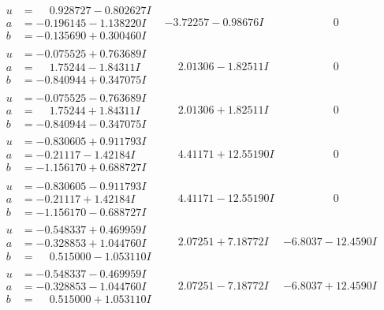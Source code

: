 \documentclass[1p]{elsarticle_modified}
\theoremstyle{definition}
\begin{document}
$$\begin{array}{c|c|c}
\begin{aligned}
u &= \phantom{-}0.928727 - 0.802627 I \\
a &= -0.196145 - 1.138220 I \\
b &= -0.135690 + 0.300460 I\end{aligned}
 & -3.72257 - 0.98676 I & \phantom{-0.000000 } 0 \\ \hline\begin{aligned}
u &= -0.075525 + 0.763689 I \\
a &= \phantom{-}1.75244 - 1.84311 I \\
b &= -0.840944 + 0.347075 I\end{aligned}
 & \phantom{-}2.01306 - 1.82511 I & \phantom{-0.000000 } 0 \\ \hline\begin{aligned}
u &= -0.075525 - 0.763689 I \\
a &= \phantom{-}1.75244 + 1.84311 I \\
b &= -0.840944 - 0.347075 I\end{aligned}
 & \phantom{-}2.01306 + 1.82511 I & \phantom{-0.000000 } 0 \\ \hline\begin{aligned}
u &= -0.830605 + 0.911793 I \\
a &= -0.21117 - 1.42184 I \\
b &= -1.156170 + 0.688727 I\end{aligned}
 & \phantom{-}4.41171 + 12.55190 I & \phantom{-0.000000 } 0 \\ \hline\begin{aligned}
u &= -0.830605 - 0.911793 I \\
a &= -0.21117 + 1.42184 I \\
b &= -1.156170 - 0.688727 I\end{aligned}
 & \phantom{-}4.41171 - 12.55190 I & \phantom{-0.000000 } 0 \\ \hline\begin{aligned}
u &= -0.548337 + 0.469959 I \\
a &= -0.328853 + 1.044760 I \\
b &= \phantom{-}0.515000 - 1.053110 I\end{aligned}
 & \phantom{-}2.07251 + 7.18772 I & -6.8037 - 12.4590 I \\ \hline\begin{aligned}
u &= -0.548337 - 0.469959 I \\
a &= -0.328853 - 1.044760 I \\
b &= \phantom{-}0.515000 + 1.053110 I\end{aligned}
 & \phantom{-}2.07251 - 7.18772 I & -6.8037 + 12.4590 I \\ \hline\begin{aligned}

\end{aligned}
\end{array}$$
\end{document}
